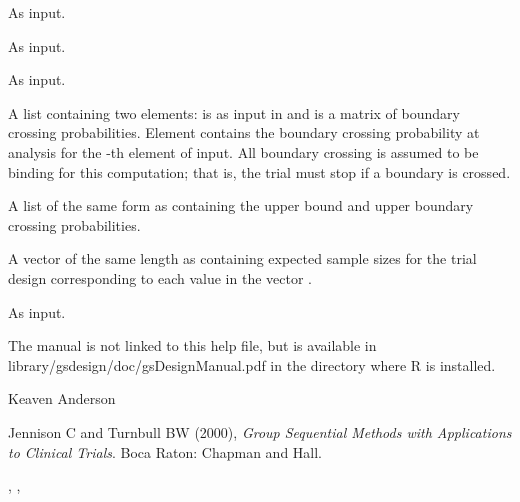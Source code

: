\begin{Value}
\begin{ldescription}
\item[\code{k}] As input.
\item[\code{theta}] As input.
\item[\code{n.I}] As input.
\item[\code{lower}] A list containing two elements:  is as input in  and  is a matrix of boundary 
crossing probabilities. Element  contains the boundary crossing probability at analysis  for the -th
element of  input. All boundary crossing is assumed to be binding for this computation; 
that is, the trial must stop if a boundary is crossed.
\item[\code{upper}] A list of the same form as  containing the upper bound and upper boundary crossing probabilities.
\item[\code{en}] A vector of the same length as  containing expected sample sizes for the trial design
corresponding to each value in the vector .
\item[\code{r}] As input.
\end{ldescription}
\end{Value}
\begin{Note}\relax
The manual is not linked to this help file, but is available in library/gsdesign/doc/gsDesignManual.pdf
in the directory where R is installed.
\end{Note}
\begin{Author}\relax
Keaven Anderson 
\end{Author}
\begin{References}\relax
Jennison C and Turnbull BW (2000), \emph{Group Sequential Methods with Applications to Clinical Trials}.
Boca Raton: Chapman and Hall.
\end{References}
\begin{SeeAlso}\relax
{}, , 
\end{SeeAlso}
